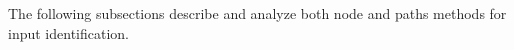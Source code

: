 The following subsections describe and analyze both node and paths
methods for input identification.

%
%
%
%
%
%
%
%
%
